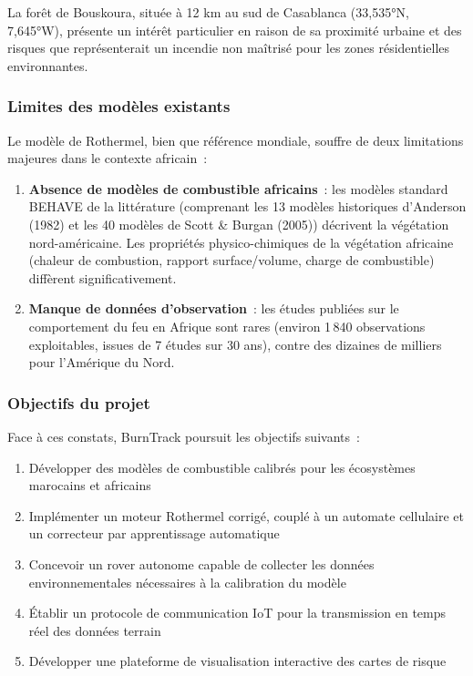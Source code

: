 \documentclass[a4paper,12pt,openany,titlepage]{scrartcl}
\begin{document}
La forêt de Bouskoura, située à 12 km au sud de Casablanca (33,535°N, 7,645°W), présente un intérêt particulier en raison de sa proximité urbaine et des risques que représenterait un incendie non maîtrisé pour les zones résidentielles environnantes.

\subsubsection{Limites des modèles existants}

Le modèle de Rothermel, bien que référence mondiale, souffre de deux limitations majeures dans le contexte africain~:

\begin{enumerate}[nosep]
    \item \textbf{Absence de modèles de combustible africains}~: les modèles standard BEHAVE de la littérature (comprenant les 13 modèles historiques d'Anderson (1982) et les 40 modèles de Scott \& Burgan (2005)) décrivent la végétation nord-américaine. Les propriétés physico-chimiques de la végétation africaine (chaleur de combustion, rapport surface/volume, charge de combustible) diffèrent significativement.
    \item \textbf{Manque de données d'observation}~: les études publiées sur le comportement du feu en Afrique sont rares (environ 1\,840 observations exploitables, issues de 7 études sur 30 ans), contre des dizaines de milliers pour l'Amérique du Nord.
\end{enumerate}

\subsubsection{Objectifs du projet}

Face à ces constats, BurnTrack poursuit les objectifs suivants~:

\begin{enumerate}[nosep]
    \item Développer des modèles de combustible calibrés pour les écosystèmes marocains et africains
    \item Implémenter un moteur Rothermel corrigé, couplé à un automate cellulaire et un correcteur par apprentissage automatique
    \item Concevoir un rover autonome capable de collecter les données environnementales nécessaires à la calibration du modèle
    \item Établir un protocole de communication IoT pour la transmission en temps réel des données terrain
    \item Développer une plateforme de visualisation interactive des cartes de risque
\end{enumerate}
\end{document}
